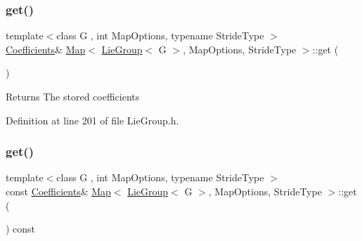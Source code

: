 \subsubsection{\texorpdfstring{get()}{get()}\hspace{0.1cm}{\footnotesize\ttfamily [1/2]}}
{\footnotesize\ttfamily template$<$class G , int Map\+Options, typename Stride\+Type $>$ \\
\hyperlink{class_map_3_01_lie_group_3_01_g_01_4_00_01_map_options_00_01_stride_type_01_4_a3140b440390b3c15c7361ab182a91f91}{Coefficients}\& \hyperlink{class_map_3_01_lie_group_3_01_g_01_4_00_01_map_options_00_01_stride_type_01_4_a141753f9a4186911b53b5b25cfd716ed}{Map}$<$ \hyperlink{class_lie_group}{Lie\+Group}$<$ G $>$, Map\+Options, Stride\+Type $>$\+::get (\begin{DoxyParamCaption}{ }\end{DoxyParamCaption})\hspace{0.3cm}{\ttfamily [inline]}}

\begin{DoxyReturn}{Returns}
The stored coefficients 
\end{DoxyReturn}


Definition at line 201 of file Lie\+Group.\+h.

\hypertarget{class_map_3_01_lie_group_3_01_g_01_4_00_01_map_options_00_01_stride_type_01_4_a6e202f2f5d1ba37f2b2a414bfa70a7e8}{}\label{class_map_3_01_lie_group_3_01_g_01_4_00_01_map_options_00_01_stride_type_01_4_a6e202f2f5d1ba37f2b2a414bfa70a7e8} 
\subsubsection{\texorpdfstring{get()}{get()}\hspace{0.1cm}{\footnotesize\ttfamily [2/2]}}
{\footnotesize\ttfamily template$<$class G , int Map\+Options, typename Stride\+Type $>$ \\
const \hyperlink{class_map_3_01_lie_group_3_01_g_01_4_00_01_map_options_00_01_stride_type_01_4_a3140b440390b3c15c7361ab182a91f91}{Coefficients}\& \hyperlink{class_map_3_01_lie_group_3_01_g_01_4_00_01_map_options_00_01_stride_type_01_4_a141753f9a4186911b53b5b25cfd716ed}{Map}$<$ \hyperlink{class_lie_group}{Lie\+Group}$<$ G $>$, Map\+Options, Stride\+Type $>$\+::get (\begin{DoxyParamCaption}{ }\end{DoxyParamCaption}) const\hspace{0.3cm}{\ttfamily [inline]}}

